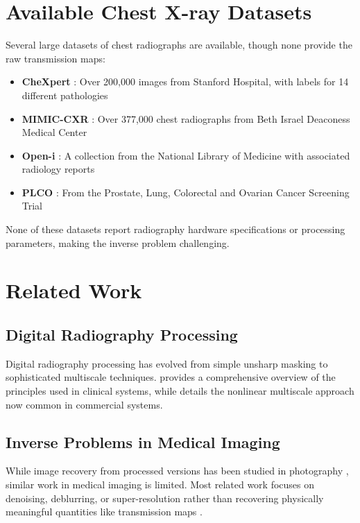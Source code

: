 \documentclass[nomenclature, english, bibtex]{kththesis}
\numberwithin{listing}{chapter}
\begin{document}
\section{Available Chest X-ray Datasets}
Several large datasets of chest radiographs are available, though none provide the raw transmission maps:
\begin{itemize}
    \item \textbf{CheXpert} \cite{irvin2019chexpert}: Over 200,000 images from Stanford Hospital, with labels for 14 different pathologies
    \item \textbf{MIMIC-CXR} \cite{johnson2019mimic}: Over 377,000 chest radiographs from Beth Israel Deaconess Medical Center
    \item \textbf{Open-i} \cite{demner2016preparing}: A collection from the National Library of Medicine with associated radiology reports

    \item \textbf{PLCO} \cite{gohagan2000prostate}: From the Prostate, Lung, Colorectal and Ovarian Cancer Screening Trial
\end{itemize}

None of these datasets report radiography hardware specifications or processing parameters, making the inverse problem challenging.

\section{Related Work}
\subsection{Digital Radiography Processing}
Digital radiography processing has evolved from simple unsharp masking to sophisticated multiscale techniques. \cite{prokop2003principles} provides a comprehensive overview of the principles used in clinical systems, while \cite{stahl2000digital} details the nonlinear multiscale approach now common in commercial systems.

\subsection{Inverse Problems in Medical Imaging}
While image recovery from processed versions has been studied in photography \cite{moran2020deeptone}, similar work in medical imaging is limited. Most related work focuses on denoising, deblurring, or super-resolution rather than recovering physically meaningful quantities like transmission maps \cite{jin2017deep}.
\end{document}
